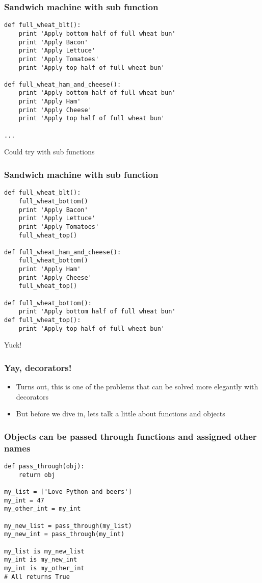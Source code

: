\documentclass{beamer}
\begin{document}
\begin{frame}[fragile]
  \frametitle{Sandwich machine with sub function}
\begin{verbatim}
def full_wheat_blt():
    print 'Apply bottom half of full wheat bun'
    print 'Apply Bacon'
    print 'Apply Lettuce'
    print 'Apply Tomatoes'
    print 'Apply top half of full wheat bun'

def full_wheat_ham_and_cheese():
    print 'Apply bottom half of full wheat bun'
    print 'Apply Ham'
    print 'Apply Cheese'
    print 'Apply top half of full wheat bun'

...
\end{verbatim}
\pause
Could try with sub functions
\end{frame}

\begin{frame}[fragile]
  \frametitle{Sandwich machine with sub function}
\begin{verbatim}
def full_wheat_blt():
    full_wheat_bottom()
    print 'Apply Bacon'
    print 'Apply Lettuce'
    print 'Apply Tomatoes'
    full_wheat_top()

def full_wheat_ham_and_cheese():
    full_wheat_bottom()
    print 'Apply Ham'
    print 'Apply Cheese'
    full_wheat_top()

def full_wheat_bottom():
    print 'Apply bottom half of full wheat bun'
def full_wheat_top():
    print 'Apply top half of full wheat bun'
\end{verbatim}
\pause
Yuck!
\end{frame}

\begin{frame}
  \frametitle{Yay, decorators!}
  \begin{itemize}
  \item Turns out, this is one of the problems that can be solved more
    elegantly with decorators
  \item But before we dive in, lets talk a little about functions and objects
  \end{itemize}
\end{frame}

\begin{frame}[fragile]
  \frametitle{Objects can be passed through functions and assigned other names}
\begin{verbatim}
def pass_through(obj):
    return obj

my_list = ['Love Python and beers']
my_int = 47
my_other_int = my_int

my_new_list = pass_through(my_list)
my_new_int = pass_through(my_int)

my_list is my_new_list
my_int is my_new_int
my_int is my_other_int
# All returns True
\end{verbatim}
\end{frame}
\end{document}
